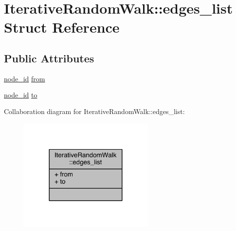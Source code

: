 \hypertarget{struct_iterative_random_walk_1_1edges__list}{\section{Iterative\+Random\+Walk\+:\+:edges\+\_\+list Struct Reference}
\label{struct_iterative_random_walk_1_1edges__list}
}
\subsection*{Public Attributes}
\begin{DoxyCompactItemize}
\item 
\hyperlink{_complex_network_8hpp_a8323334ca788fde39682469321590d52}{node\+\_\+id} \hyperlink{struct_iterative_random_walk_1_1edges__list_a939cd47cfe0fc7d91ff26f1072546f0e}{from}
\item 
\hyperlink{_complex_network_8hpp_a8323334ca788fde39682469321590d52}{node\+\_\+id} \hyperlink{struct_iterative_random_walk_1_1edges__list_abbca71fc691d4490df3b110128ff9985}{to}
\end{DoxyCompactItemize}


Collaboration diagram for Iterative\+Random\+Walk\+:\+:edges\+\_\+list\+:\nopagebreak
\begin{figure}[H]
\begin{center}
\leavevmode
\includegraphics[width=192pt]{struct_iterative_random_walk_1_1edges__list__coll__graph}
\end{center}
\end{figure}


